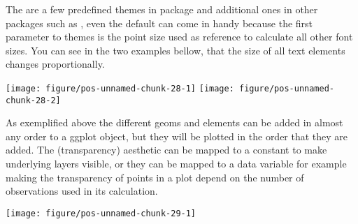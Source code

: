 \documentclass[paper=a4,10pt,div=17,headsepline,BCOR=12mm,twoside,open=right]{scrbook}\usepackage{knitr}
\begin{document}
The are a few predefined themes in package \ggplot and additional ones in other packages such as \cowplot, even the default  can come in handy because the first parameter to themes is the point size used as reference to calculate all other font sizes. You can see in the two examples bellow, that the size of all text elements changes proportionally.

\begin{knitrout}\footnotesize
{}\color{fgcolor}\begin{kframe}
\begin{alltt}
 \hlopt{+}  \hlopt{+} \hlstd{(}\hlstd{)}
 \hlopt{+}  \hlopt{+} \hlstd{(}\hlstd{)}
\end{alltt}
\end{kframe}

{\centering \texttt{[image: figure/pos-unnamed-chunk-28-1]} 
\texttt{[image: figure/pos-unnamed-chunk-28-2]} 

}



\end{knitrout}

As exemplified above the different geoms and elements can be added in almost any order to a ggplot object, but they will be plotted in the order that they are added. The  (transparency) aesthetic can be mapped to a constant to make underlying layers visible, or they can be mapped to a data variable for example making the transparency of points in a plot depend on the number of observations used in its calculation.

\begin{knitrout}\footnotesize
{}\color{fgcolor}\begin{kframe}
\begin{alltt}
\hlstd{(}  \hlstd{(}  \hlstd{=} \hlopt{+}
  \hlstd{()} \hlopt{+} \hlstd{(}\hlstd{=}\hlstd{,} \hlstd{=}\hlstd{)}
\end{alltt}
\end{kframe}

{\centering \texttt{[image: figure/pos-unnamed-chunk-29-1]} 

}



\end{knitrout}
\end{document}
